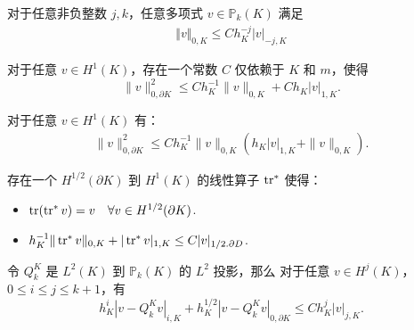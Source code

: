 \begin{lemma}[多项式逆不等式]
    \cite[引理10]{Huang2020}\cite[引理2.1]{2021WeiHuangLi}
    对于任意非负整数 $j, k$，任意多项式 $v\in \mathbb P_k(K)$ 满足
    \begin{equation}
    \label{eq:polyinverse}
    \begin{aligned}
    \Vert v\Vert_{0, K} \leq Ch^{-j}_K|v|_{-j, K}
    \end{aligned}
    \end{equation}
\end{lemma}
\begin{lemma}[迹不等式]
    对于任意 $v\in H^1(K)$，存在一个常数 $C$ 仅依赖于 $K$ 和 $m$，使得
    \begin{equation}
        \label{L2trace}
    \|v\|_{0, \partial K}^2 \leq C h_K^{-1}\|v\|_{0, K} + Ch_K|v|_{1, K}.
    \end{equation}
\end{lemma}
\begin{lemma}[乘型迹不等式]\cite[Theorem 1.5.1.10]{Grisvard1985}
    \label{lemma:multiplicative_trace}
    对于任意 $v\in H^1(K)$ 有：
    \begin{equation}
    \label{eq:multiplicative_trace}
    \begin{aligned}
    \|v\|_{0, \partial K}^2 \leq Ch_K^{-1}\|v\|_{0, K}(h_K|v|_{1, K} + \|v\|_{0, K}).
    \end{aligned}
    \end{equation}
\end{lemma}
\begin{lemma}[逆迹定理]
    存在一个 $H^{1/2}(\partial K)$ 到 $H^1(K)$ 的线性算子 $\operatorname{tr}^{*}$ 使得：
    \begin{itemize}
        \item $\operatorname{tr}(\operatorname{tr}^{*} v) = v \quad \forall v \in H^{1/2}(\partial K)$.
        \item $h^{-1}_K \| \operatorname{tr}^* v \|_{0, K} + |\operatorname{tr}^* v|_{1, K} \leq
            C |v|_{1/2. \partial D}$.
    \end{itemize}
\end{lemma}
\begin{lemma}[$L^2$ 投影估计]
    令 $Q_k^K$ 是 $L^2(K)$ 到 $\mathbb P_k(K)$ 的 $L^2$ 投影，那么 
    对于任意 $v\in H^j(K)$，$0\leq i\leq j\leq k+1$，有
    \begin{equation}
        \label{eq:l2projectionestimate}
    h_K^i|v - Q_k^K v|_{i, K} + h_K^{1/2}|v - Q_k^K v|_{0, \partial K}
    \leq Ch_K^{j}|v|_{j, K}.
    \end{equation}
\end{lemma}


